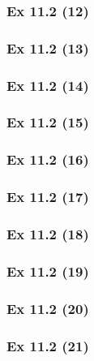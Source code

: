 \subsubsection{Ex 11.2 (12)}\label{sec:Ex_11.2.12}

\subsubsection{Ex 11.2 (13)}\label{sec:Ex_11.2.13}

\subsubsection{Ex 11.2 (14)}\label{sec:Ex_11.2.14}

\subsubsection{Ex 11.2 (15)}\label{sec:Ex_11.2.15}

\subsubsection{Ex 11.2 (16)}\label{sec:Ex_11.2.16}

\subsubsection{Ex 11.2 (17)}\label{sec:Ex_11.2.17}

\subsubsection{Ex 11.2 (18)}\label{sec:Ex_11.2.18}

\subsubsection{Ex 11.2 (19)}\label{sec:Ex_11.2.19}

\subsubsection{Ex 11.2 (20)}\label{sec:Ex_11.2.20}

\newpage		%

\subsubsection{Ex 11.2 (21)}\label{sec:Ex_11.2.21}

